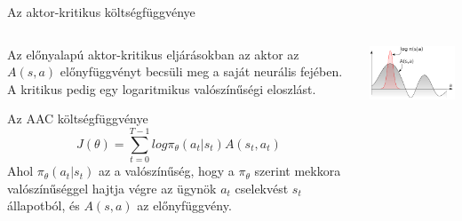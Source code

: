 \documentclass[english, aspectratio=169]{beamer}
\begin{document}
\begin{frame}{Az aktor-kritikus költségfüggvénye}
\begin{columns}
\begin{column}{.5\textwidth}
Az előnyalapú aktor-kritikus eljárásokban az aktor az $A(s,a)$ előnyfüggvényt becsüli meg a saját neurális fejében. A kritikus pedig egy logaritmikus valószínűségi eloszlást.
\begin{block}{Az AAC költségfüggvénye}
\[
J(\theta) = \sum_{t=0}^{T-1} log \pi_\theta (a_t \vert s_t) A(s_t,a_t)
\]
Ahol $\pi_\theta (a_t \vert s_t)$ az a valószínűség, hogy a $\pi_\theta$ szerint mekkora valószínűséggel hajtja végre az ügynök $a_t$ cselekvést $s_t$ állapotból, és $A(s,a)$ az előnyfüggvény.
\end{block}
\end{column}
\begin{column}{.5\textwidth}
\begin{center}
\includegraphics[width=7cm, keepaspectratio]{images/dql_3.png}
\end{center}
\end{column}
\end{columns}
\end{frame}
\end{document}

